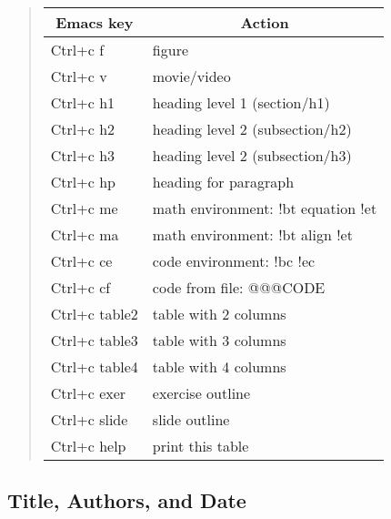 \documentclass[%
oneside,                 %
final,                   %
10pt]{article}
\begin{document}
\begin{quote}\begin{tabular}{ll}
\hline
\multicolumn{1}{c}{ Emacs key } & \multicolumn{1}{c}{ Action } \\
\hline
Ctrl+c f                           & figure                             \\
Ctrl+c v                           & movie/video                        \\
Ctrl+c h1                          & heading level 1 (section/h1)       \\
Ctrl+c h2                          & heading level 2 (subsection/h2)    \\
Ctrl+c h3                          & heading level 2 (subsection/h3)    \\
Ctrl+c hp                          & heading for paragraph              \\
Ctrl+c me                          & math environment: !bt equation !et \\
Ctrl+c ma                          & math environment: !bt align !et    \\
Ctrl+c ce                          & code environment: !bc !ec          \\
Ctrl+c cf                          & code from file: @@@CODE            \\
Ctrl+c table2                      & table with 2 columns               \\
Ctrl+c table3                      & table with 3 columns               \\
Ctrl+c table4                      & table with 4 columns               \\
Ctrl+c exer                        & exercise outline                   \\
Ctrl+c slide                       & slide outline                      \\
Ctrl+c help                        & print this table                   \\
\hline
\end{tabular}\end{quote}

\noindent
\subsection{Title, Authors, and Date}
\end{document}
